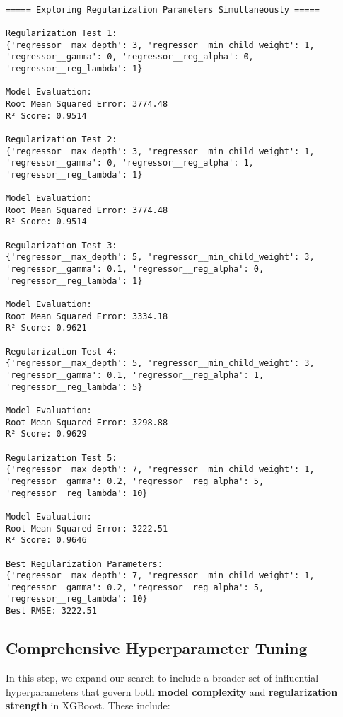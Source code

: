 \documentclass[
  letterpaper,
  DIV=11,
  numbers=noendperiod]{scrreprt}
\begin{document}
\begin{verbatim}

===== Exploring Regularization Parameters Simultaneously =====

Regularization Test 1:
{'regressor__max_depth': 3, 'regressor__min_child_weight': 1, 'regressor__gamma': 0, 'regressor__reg_alpha': 0, 'regressor__reg_lambda': 1}

Model Evaluation:
Root Mean Squared Error: 3774.48
R² Score: 0.9514

Regularization Test 2:
{'regressor__max_depth': 3, 'regressor__min_child_weight': 1, 'regressor__gamma': 0, 'regressor__reg_alpha': 1, 'regressor__reg_lambda': 1}

Model Evaluation:
Root Mean Squared Error: 3774.48
R² Score: 0.9514

Regularization Test 3:
{'regressor__max_depth': 5, 'regressor__min_child_weight': 3, 'regressor__gamma': 0.1, 'regressor__reg_alpha': 0, 'regressor__reg_lambda': 1}

Model Evaluation:
Root Mean Squared Error: 3334.18
R² Score: 0.9621

Regularization Test 4:
{'regressor__max_depth': 5, 'regressor__min_child_weight': 3, 'regressor__gamma': 0.1, 'regressor__reg_alpha': 1, 'regressor__reg_lambda': 5}

Model Evaluation:
Root Mean Squared Error: 3298.88
R² Score: 0.9629

Regularization Test 5:
{'regressor__max_depth': 7, 'regressor__min_child_weight': 1, 'regressor__gamma': 0.2, 'regressor__reg_alpha': 5, 'regressor__reg_lambda': 10}

Model Evaluation:
Root Mean Squared Error: 3222.51
R² Score: 0.9646

Best Regularization Parameters:
{'regressor__max_depth': 7, 'regressor__min_child_weight': 1, 'regressor__gamma': 0.2, 'regressor__reg_alpha': 5, 'regressor__reg_lambda': 10}
Best RMSE: 3222.51
\end{verbatim}

\subsection{Comprehensive Hyperparameter
Tuning}\label{comprehensive-hyperparameter-tuning}

In this step, we expand our search to include a broader set of
influential hyperparameters that govern both \textbf{model complexity}
and \textbf{regularization strength} in XGBoost. These include:
\end{document}
